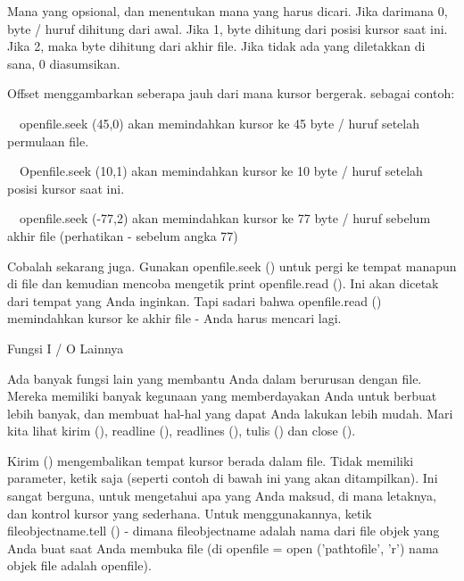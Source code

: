 \documentclass[a4paper,12pt]{report}
\begin{document}
\noindent 
\vspace{12pt}
\noindent 
Mana yang opsional, dan menentukan mana yang harus dicari. Jika darimana 0, byte / huruf dihitung dari awal. Jika 1, byte dihitung dari posisi kursor saat ini. Jika 2, maka byte dihitung dari akhir file. Jika tidak ada yang diletakkan di sana, 0 diasumsikan. \par
\noindent 
\vspace{12pt}
\noindent 
Offset menggambarkan seberapa jauh dari mana kursor bergerak. sebagai contoh: \par
\noindent 
\vspace{12pt}
\noindent 
 $  $ $  $ $  $ $  $openfile.seek (45,0) akan memindahkan kursor ke 45 byte / huruf setelah permulaan file. \par
\noindent 
 $  $ $  $ $  $ $  $Openfile.seek (10,1) akan memindahkan kursor ke 10 byte / huruf setelah posisi kursor saat ini. \par
\noindent 
 $  $ $  $ $  $ $  $openfile.seek (-77,2) akan memindahkan kursor ke 77 byte / huruf sebelum akhir file (perhatikan - sebelum angka 77) \par
\noindent 
\vspace{12pt}
\noindent 
Cobalah sekarang juga. Gunakan openfile.seek () untuk pergi ke tempat manapun di file dan kemudian mencoba mengetik print openfile.read (). Ini akan dicetak dari tempat yang Anda inginkan. Tapi sadari bahwa openfile.read () memindahkan kursor ke akhir file - Anda harus mencari lagi. \par
\vspace{14pt}
\noindent 
Fungsi I / O Lainnya \par
\noindent 
\vspace{12pt}
\noindent 
Ada banyak fungsi lain yang membantu Anda dalam berurusan dengan file. Mereka memiliki banyak kegunaan yang memberdayakan Anda untuk berbuat lebih banyak, dan membuat hal-hal yang dapat Anda lakukan lebih mudah. Mari kita lihat kirim (), readline (), readlines (), tulis () dan close (). \par
\noindent 
\vspace{12pt}
\noindent 
Kirim () mengembalikan tempat kursor berada dalam file. Tidak memiliki parameter, ketik saja (seperti contoh di bawah ini yang akan ditampilkan). Ini sangat berguna, untuk mengetahui apa yang Anda maksud, di mana letaknya, dan kontrol kursor yang sederhana. Untuk menggunakannya, ketik fileobjectname.tell () - dimana fileobjectname adalah nama dari file objek yang Anda buat saat Anda membuka file (di openfile = open ('pathtofile', 'r') nama objek file adalah openfile). \par
\end{document}
